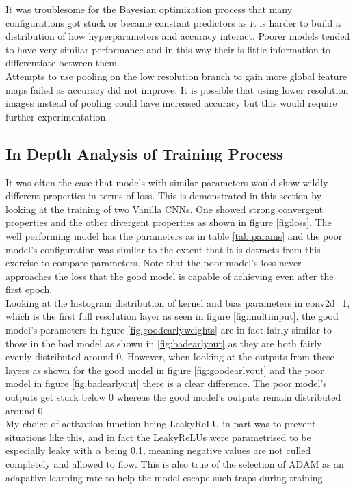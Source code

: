 \documentclass{article}
\begin{document}
{It was troublesome for the Bayesian optimization process that many configurations got stuck or became constant predictors as it is harder to build a distribution of how hyperparameters and accuracy interact. Poorer models tended to have very similar performance and in this way their is little information to differentiate between them. \\

Attempts to use pooling on the low resolution branch to gain more global feature maps failed as accuracy did not improve. It is possible that using lower resolution images instead of pooling could have increased accuracy but this would require further experimentation. \\


\subsection{In Depth Analysis of Training Process}
It was often the case that models with similar parameters would show wildly different properties in terms of loss. This is demonstrated in this section by looking at the training of two Vanilla CNNs. One showed strong convergent properties and the other divergent properties as shown in figure \ref{fig:loss}. The well performing model has the parameters as in table \ref{tab:params} and the poor model's configuration was similar to the extent that it is detracts from this exercise to compare parameters. Note that the poor model's loss never approaches the loss that the good model is capable of achieving even after the first epoch.\\

Looking at the histogram distribution of kernel and bias parameters in conv2d\_1, which is the first full resolution layer as seen in figure \ref{fig:multiinput},  the good model's parameters in figure \ref{fig:goodearlyweights} are in fact fairly similar to those in the bad model as shown in \ref{fig:badearlyout} as they are both fairly evenly distributed around 0. However, when looking at the outputs from these layers as shown for the good model in figure \ref{fig:goodearlyout} and the poor model in figure \ref{fig:badearlyout} there is a clear difference. The poor model's outputs get stuck below 0 whereas the good model's outputs remain distributed around 0. \\

My choice of activation function being LeakyReLU in part was to prevent situations like this, and in fact the LeakyReLUs were parametrised to be especially leaky with $\alpha$ being 0.1, meaning negative values are not culled completely and allowed to flow. This is also true of the selection of ADAM as an adapative learning rate to help the model escape such traps during training.\\

}
\end{document}
